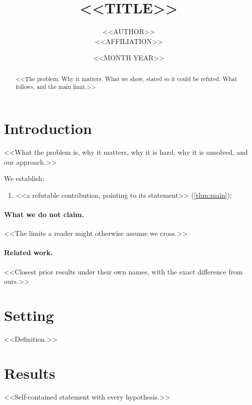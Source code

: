\documentclass[a4paper,11pt]{article}
\title{<<TITLE>>}
\author{<<AUTHOR>>\\[2pt]\normalsize <<AFFILIATION>>}
\date{<<MONTH YEAR>>}
\begin{document}
\maketitle

\begin{abstract}
<<The problem. Why it matters. What we show, stated so it could be refuted. What follows, and the main limit.>>
\end{abstract}

\section{Introduction}\label{sec:intro}

<<What the problem is, why it matters, why it is hard, why it is unsolved, and our approach.>>

We establish:
\begin{enumerate}[leftmargin=2em]
\item <<a refutable contribution, pointing to its statement>> (\cref{thm:main});
\end{enumerate}

\paragraph{What we do not claim.} <<The limits a reader might otherwise assume we cross.>>

\paragraph{Related work.} <<Closest prior results under their own names, with the exact difference from ours.>>

\section{Setting}\label{sec:setting}

\begin{definition}\label{def:object}
<<Definition.>>
\end{definition}

\section{Results}\label{sec:results}

\begin{theorem}\label{thm:main}
<<Self-contained statement with every hypothesis.>>
\end{theorem}
\end{document}
